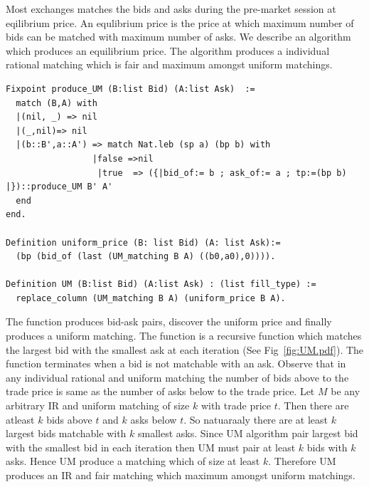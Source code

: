 \documentclass[a4paper,UKenglish,cleveref, autoref]{lipics-v2019}
\begin{document}
Most exchanges matches the bids and asks during the pre-market session at eqilibrium price.  An equlibrium price is the price at which maximum number of bids can be matched with maximum number of asks. We describe an algorithm which produces an equilibrium price. The algorithm  produces a individual rational matching which is fair and maximum amongst uniform matchings.

\begin{verbatim}
Fixpoint produce_UM (B:list Bid) (A:list Ask)  :=
  match (B,A) with
  |(nil, _) => nil
  |(_,nil)=> nil
  |(b::B',a::A') => match Nat.leb (sp a) (bp b) with
                 |false =>nil
                  |true  => ({|bid_of:= b ; ask_of:= a ; tp:=(bp b) |})::produce_UM B' A'
  end
end.

Definition uniform_price (B: list Bid) (A: list Ask):=
  (bp (bid_of (last (UM_matching B A) ((b0,a0),0)))).

Definition UM (B:list Bid) (A:list Ask) : (list fill_type) :=
  replace_column (UM_matching B A) (uniform_price B A).

\end{verbatim}


The function  produces bid-ask pairs,  discover the uniform price and finally  produces a uniform matching. The function  is a recursive function which matches the largest bid with the smallest ask at each iteration (See Fig~\ref{fig:UM.pdf}). The function terminates when a bid is not matchable with an ask. Observe that in any individual rational and uniform matching the number of bids above to the trade price is same as the number of asks below to the trade price. Let $M$ be any arbitrary IR and uniform matching of size $k$ with trade price $t$. Then there are atleast $k$ bids above $t$ and $k$ asks below $t$. So natuaraaly there are at least $k$ largest bids matchable with $k$ smallest asks. Since UM algorithm pair largest bid with the smallest bid in each iteration then UM must pair at least $k$ bids with $k$ asks. Hence UM produce a matching which of size at least $k$. Therefore UM produces an IR and fair matching which maximum amongst uniform matchings. 

\begin{theorem}
\end{theorem}
\end{document}
